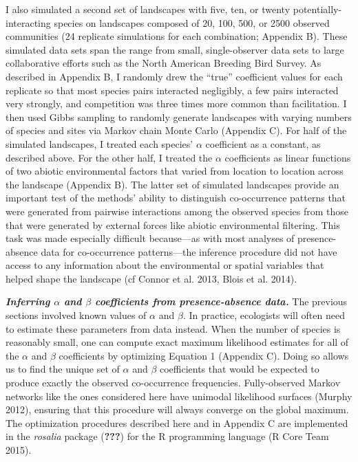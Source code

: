 \documentclass[12pt,]{article}
\begin{document}
\begin{spacing}{1.9}
\begin{flushleft}
I also simulated a second set of landscapes with five, ten, or twenty
potentially-interacting species on landscapes composed of 20, 100, 500,
or 2500 observed communities (24 replicate simulations for each
combination; Appendix B). These simulated data sets span the range from
small, single-observer data sets to large collaborative efforts such as
the North American Breeding Bird Survey. As described in Appendix B, I
randomly drew the ``true'' coefficient values for each replicate so that
most species pairs interacted negligibly, a few pairs interacted very
strongly, and competition was three times more common than facilitation.
I then used Gibbs sampling to randomly generate landscapes with varying
numbers of species and sites via Markov chain Monte Carlo (Appendix C).
For half of the simulated landscapes, I treated each species' \(\alpha\)
coefficient as a constant, as described above. For the other half, I
treated the \(\alpha\) coefficients as linear functions of two abiotic
environmental factors that varied from location to location across the
landscape (Appendix B). The latter set of simulated landscapes provide
an important test of the methods' ability to distinguish co-occurrence
patterns that were generated from pairwise interactions among the
observed species from those that were generated by external forces like
abiotic environmental filtering. This task was made especially difficult
because---as with most analyses of presence-absence data for
co-occurrence patterns---the inference procedure did not have access to
any information about the environmental or spatial variables that helped
shape the landscape (cf Connor et al. 2013, Blois et al. 2014).

\textbf{\emph{Inferring \(\alpha\) and \(\beta\) coefficients from
presence-absence data.}} The previous sections involved known values of
\(\alpha\) and \(\beta\). In practice, ecologists will often need to
estimate these parameters from data instead. When the number of species
is reasonably small, one can compute exact maximum likelihood estimates
for all of the \(\alpha\) and \(\beta\) coefficients by optimizing
Equation 1 (Appendix C). Doing so allows us to find the unique set of
\(\alpha\) and \(\beta\) coefficients that would be expected to produce
exactly the observed co-occurrence frequencies. Fully-observed Markov
networks like the ones considered here have unimodal likelihood surfaces
(Murphy 2012), ensuring that this procedure will always converge on the
global maximum. The optimization procedures described here and in
Appendix C are implemented in the \emph{rosalia} package
({\textbf{???}}) for the R programming language (R Core Team 2015).


\end{flushleft}
\end{spacing}
\end{document}
